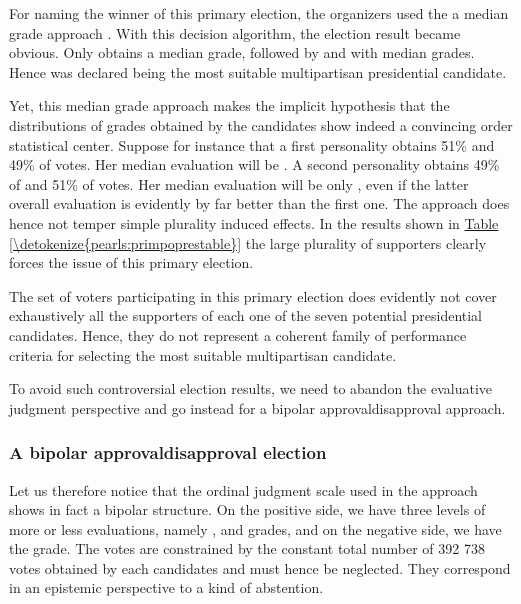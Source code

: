 \documentclass[a4paper,12pt,english]{sphinxhowto}
\begin{document}
\sphinxAtStartPar
For naming the winner of this primary election, the organizers used the  \sphinxhyphen{}a median grade\sphinxhyphen{} approach . With this decision algorithm, the election result became obvious. Only  obtains a  median grade, followed by  and  with  median grades. Hence  was declared being the most suitable multipartisan presidential candidate.

\sphinxAtStartPar
Yet, this median grade approach makes the implicit hypothesis that the distributions of grades obtained by the candidates show indeed a convincing order statistical center. Suppose for instance that a first personality obtains 51\%  and 49\% of  votes. Her median evaluation will be . A second personality obtains 49\% of  and 51\% of  votes. Her median evaluation will be only , even if the latter overall evaluation is evidently by far better than the first one. The  approach does hence not temper simple plurality induced effects. In the results shown in \hyperref[\detokenize{pearls:primpoprestable}]{Table \ref{\detokenize{pearls:primpoprestable}}} the large plurality of  supporters clearly forces the issue of this primary election.

\sphinxAtStartPar
The set of voters participating in this primary election does evidently not cover exhaustively  all the supporters of each one of the seven potential presidential candidates. Hence, they do not represent a coherent family of performance criteria for selecting the most suitable multipartisan candidate.

\sphinxAtStartPar
To avoid such controversial election results, we need to abandon the evaluative judgment perspective and go instead for a bipolar approval\sphinxhyphen{}disapproval approach.


\subsubsection{A bipolar approval\sphinxhyphen{}disapproval election}
\label{\detokenize{pearls:a-bipolar-approval-disapproval-election}}
\sphinxAtStartPar
Let us therefore notice that the ordinal judgment scale used in the  approach shows in fact a bipolar structure. On the positive side, we have three levels of more or less  evaluations, namely ,  and   grades, and on the negative side, we have the  grade. The  votes are constrained by the constant total number of 392 738 votes obtained by each candidates and must hence be neglected. They correspond in an epistemic perspective to a kind of abstention.
\end{document}
